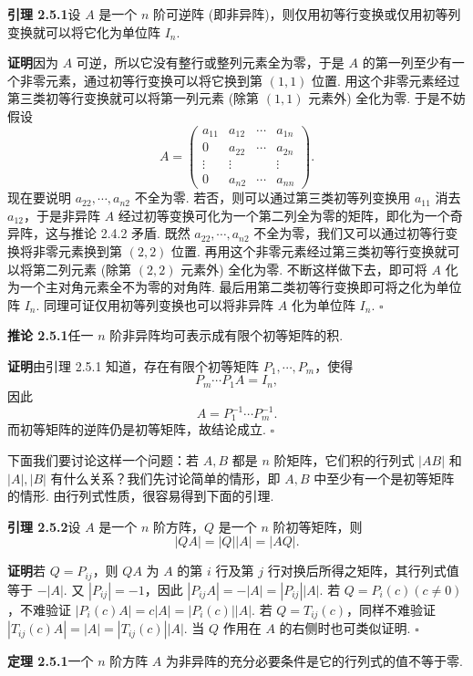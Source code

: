 \documentclass[UTF8,12pt,a4paper,fontset=fandol]{ctexart}
\begin{document}
\noindent\textbf{引理 2.5.1}\quad 设 $A$ 是一个 $n$ 阶可逆阵 (即非异阵)，则仅用初等行变换或仅用初等列变换就可以将它化为单位阵 $I_n$.

\noindent\textbf{证明}\quad 因为 $A$ 可逆，所以它没有整行或整列元素全为零，于是 $A$ 的第一列至少有一个非零元素，通过初等行变换可以将它换到第 $(1,1)$ 位置. 用这个非零元素经过第三类初等行变换就可以将第一列元素 (除第 $(1,1)$ 元素外) 全化为零. 于是不妨假设
\[
A=\left(\begin{array}{cccc}
a_{11} & a_{12} & \cdots & a_{1n}\\
0 & a_{22} & \cdots & a_{2n}\\
\vdots & \vdots & & \vdots\\
0 & a_{n2} & \cdots & a_{nn}
\end{array}\right).
\]
现在要说明 $a_{22},\cdots,a_{n2}$ 不全为零. 若否，则可以通过第三类初等列变换用 $a_{11}$ 消去 $a_{12}$，于是非异阵 $A$ 经过初等变换可化为一个第二列全为零的矩阵，即化为一个奇异阵，这与推论 2.4.2 矛盾. 既然 $a_{22},\cdots,a_{n2}$ 不全为零，我们又可以通过初等行变换将非零元素换到第 $(2,2)$ 位置. 再用这个非零元素经过第三类初等行变换就可以将第二列元素 (除第 $(2,2)$ 元素外) 全化为零. 不断这样做下去，即可将 $A$ 化为一个主对角元素全不为零的对角阵. 最后用第二类初等行变换即可将之化为单位阵 $I_n$. 同理可证仅用初等列变换也可以将非异阵 $A$ 化为单位阵 $I_n$. $\square$

\noindent\textbf{推论 2.5.1}\quad 任一 $n$ 阶非异阵均可表示成有限个初等矩阵的积.

\noindent\textbf{证明}\quad 由引理 2.5.1 知道，存在有限个初等矩阵 $P_1,\cdots,P_m$，使得
\[
P_m\cdots P_1A=I_n,
\]
因此
\[
A=P_1^{-1}\cdots P_m^{-1}.
\]
而初等矩阵的逆阵仍是初等矩阵，故结论成立. $\square$

下面我们要讨论这样一个问题：若 $A,B$ 都是 $n$ 阶矩阵，它们积的行列式 $|AB|$ 和 $|A|,|B|$ 有什么关系？我们先讨论简单的情形，即 $A,B$ 中至少有一个是初等矩阵的情形. 由行列式性质，很容易得到下面的引理.

\noindent\textbf{引理 2.5.2}\quad 设 $A$ 是一个 $n$ 阶方阵，$Q$ 是一个 $n$ 阶初等矩阵，则
\[
|QA|=|Q||A|=|AQ|.
\]

\noindent\textbf{证明}\quad 若 $Q=P_{ij}$，则 $QA$ 为 $A$ 的第 $i$ 行及第 $j$ 行对换后所得之矩阵，其行列式值等于 $-|A|$. 又 $|P_{ij}|=-1$，因此 $|P_{ij}A|=-|A|=|P_{ij}||A|$. 若 $Q=P_i(c)(c\ne 0)$，不难验证 $|P_i(c)A|=c|A|=|P_i(c)||A|$. 若 $Q=T_{ij}(c)$，同样不难验证 $|T_{ij}(c)A|=|A|=|T_{ij}(c)||A|$. 当 $Q$ 作用在 $A$ 的右侧时也可类似证明. $\square$

\noindent\textbf{定理 2.5.1}\quad 一个 $n$ 阶方阵 $A$ 为非异阵的充分必要条件是它的行列式的值不等于零.
\end{document}

